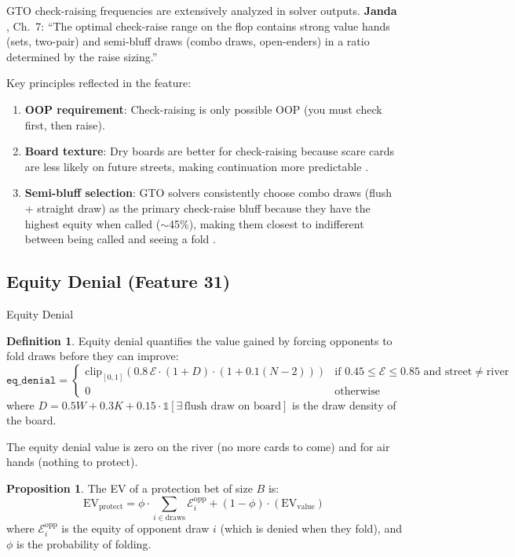 \documentclass[11pt, a4paper]{article}
\theoremstyle{definition}
\newtheorem{definition}{Definition}[section]
\newtheorem{proposition}{Proposition}[section]
\newcommand{\feature}[1]{\texttt{#1}}
\newcommand{\clip}[1]{\text{clip}_{[0,1]}\!\left(#1\right)}
\begin{document}
\begin{refbox}
GTO check-raising frequencies are extensively analyzed in solver outputs. \textbf{Janda} \cite{janda2017}, Ch.~7: ``The optimal check-raise range on the flop contains strong value hands (sets, two-pair) and semi-bluff draws (combo draws, open-enders) in a ratio determined by the raise sizing.''

Key principles reflected in the feature:
\begin{enumerate}
    \item \textbf{OOP requirement}: Check-raising is only possible OOP (you must check first, then raise).
    \item \textbf{Board texture}: Dry boards are better for check-raising because scare cards are less likely on future streets, making continuation more predictable \cite{janda2017}.
    \item \textbf{Semi-bluff selection}: GTO solvers consistently choose combo draws (flush + straight draw) as the primary check-raise bluff because they have the highest equity when called ($\sim$45\%), making them closest to indifferent between being called and seeing a fold \cite{tipton2019}.
\end{enumerate}
\end{refbox}

\subsection{Equity Denial (Feature 31)}

\begin{featurebox}{Equity Denial}
\begin{definition}
Equity denial quantifies the value gained by forcing opponents to fold draws before they can improve:
\begin{equation}
    \feature{eq\_denial} = \begin{cases}
        \clip{0.8\,\mathcal{E} \cdot (1 + D) \cdot (1 + 0.1(N-2))} & \text{if } 0.45 \leq \mathcal{E} \leq 0.85 \text{ and street} \neq \text{river} \\
        0 & \text{otherwise}
    \end{cases}
\end{equation}
where $D = 0.5W + 0.3K + 0.15 \cdot \mathbb{1}[\exists\, \text{flush draw on board}]$ is the draw density of the board.

The equity denial value is zero on the river (no more cards to come) and for air hands (nothing to protect).
\end{definition}

\begin{proposition}
The EV of a protection bet of size $B$ is:
\begin{equation}
    \text{EV}_{\text{protect}} = \phi \cdot \sum_{i \in \text{draws}} \mathcal{E}_i^{\text{opp}} + (1 - \phi) \cdot (\text{EV}_{\text{value}})
\end{equation}
where $\mathcal{E}_i^{\text{opp}}$ is the equity of opponent draw $i$ (which is denied when they fold), and $\phi$ is the probability of folding.
\end{proposition}
\end{featurebox}
\end{document}
